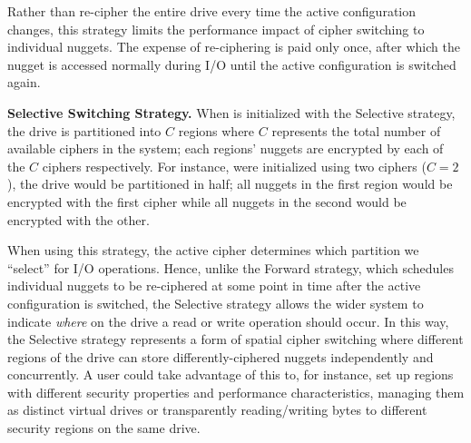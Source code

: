 Rather than re-cipher the entire drive every time the active configuration
changes, this strategy limits the performance impact of cipher switching to
individual nuggets. The expense of re-ciphering is paid only once, after which
the nugget is accessed normally during I/O until the active configuration is
switched again.


\textbf{Selective Switching Strategy.} When \sys{} is initialized with the
Selective strategy, the drive is partitioned into $C$ regions where $C$
represents the total number of available ciphers in the system; each regions'
nuggets are encrypted by each of the $C$ ciphers respectively. For instance,
were \sys{} initialized using two ciphers ($C = 2$), the drive would be
partitioned in half; all nuggets in the first region would be encrypted with the
first cipher while all nuggets in the second would be encrypted with the other.


When using this strategy, the active cipher determines which partition we
``select'' for I/O operations. Hence, unlike the Forward strategy, which
schedules individual nuggets to be re-ciphered at some point in time after the
active configuration is switched, the Selective strategy allows the wider system
to indicate \emph{where} on the drive a read or write operation should occur. In
this way, the Selective strategy represents a form of spatial cipher switching
where different regions of the drive can store differently-ciphered nuggets
independently and concurrently. A user could take advantage of this to, for
instance, set up regions with different security properties and performance
characteristics, managing them as distinct virtual drives or transparently
reading/writing bytes to different security regions on the same drive.

